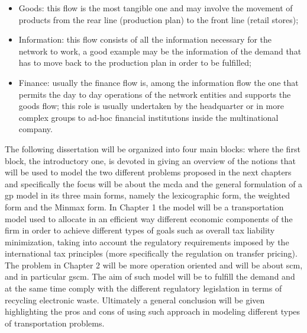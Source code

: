 \begin{doublespace}
\begin{itemize}
 \item Goods: this flow is the most tangible one and may involve the movement of products from the rear line (production plan) to the front line (retail stores);    
\item Information: this flow consists of all the information necessary for the network to work, a good example may be the information of the demand that has to move back to the production plan in order to be fulfilled;
\item Finance: usually the finance flow is, among the information flow the one that permits the day to day operations of the network entities and supports the goods flow; this role is usually undertaken by the headquarter or in more complex groups to ad-hoc financial institutions inside the multinational company. 
\end{itemize}

The following dissertation will be organized into four main blocks: where the first block, the introductory one, is devoted in giving an overview of the notions that will be used to model the two different problems proposed in the next chapters and specifically the focus will be about the \gls{mcda} and the general formulation of a \gls{gp} model in its three main forms, namely the lexicographic form, the weighted form and the Minmax form. In Chapter 1 the model will be a transportation model used to allocate in an efficient way different economic components of the firm in order to achieve different types of goals such as overall tax liability minimization, taking into account the regulatory requirements imposed by the international tax principles (more specifically the regulation on transfer pricing). The problem in Chapter 2 will be more operation oriented and will be about \gls{scm}, and in particular \gls{gscm}. The aim of such model will be to fulfill the demand and at the same time comply with the different regulatory legislation in terms of recycling electronic waste. Ultimately a general conclusion will be given highlighting the pros and cons of using such approach in modeling different types of transportation problems.


\end{doublespace}
